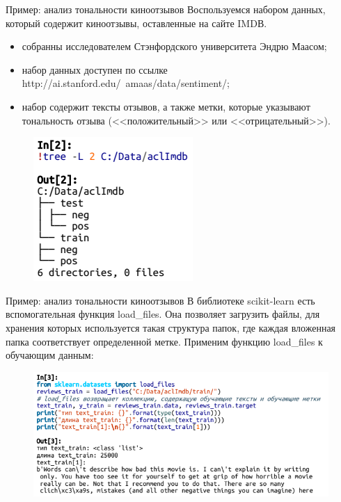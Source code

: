 \documentclass{beamer}
\begin{document}
\begin{frame}{Пример: анализ тональности киноотзывов}
Воспользуемся набором данных, который содержит киноотзывы, оставленные на сайте IMDВ.
\begin{itemize}
\item собранны исследователем Стэнфордского университета Эндрю Маасом;
\item набор данных доступен по ссылке http://ai.stanford.edu/~amaas/data/sentiment/;
\item набор содержит тексты отзывов, а также метки, которые указывают тональность отзыва (<<положительный>> или <<отрицательный>>).
\end{itemize}
\begin{figure}[h]
\centering
\includegraphics[scale=0.5]{images/lec09-pic01.png}
\end{figure}
\end{frame}

\begin{frame}{Пример: анализ тональности киноотзывов}
В библиотеке scikit-learn есть вспомогательная функция load\_files. Она позволяет загрузить файлы,
для хранения которых используется такая структура папок, где каждая вложенная папка соответствует определенной метке. Применим функцию load\_files к обучающим данным:
\begin{figure}[h]
\centering
\includegraphics[scale=0.6]{images/lec09-pic02.png}
\end{figure}
\end{frame}
\end{document}

